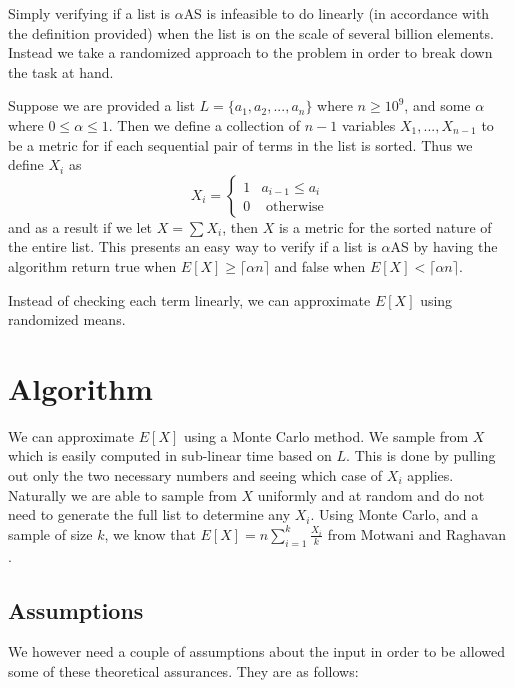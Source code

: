 \documentclass[11pt]{article}
\begin{document}
Simply verifying if a list is $\alpha$AS is infeasible to do linearly (in accordance with the definition provided) when the list is on the scale of several billion elements. Instead we take a randomized approach to the problem in order to break down the task at hand. 

Suppose we are provided a list $L = \{a_1, a_2, ..., a_n\}$ where $n \geq 10^9$, and some $\alpha$ where $0 \leq \alpha \leq 1$. Then we define a collection of $n-1$ variables $X_1, ..., X_{n-1}$ to be a metric for if each sequential pair of terms in the list is sorted. Thus we define $X_i$ as
$$X_i = 
\begin{cases}
	1 & a_{i-1} \leq a_i \\
	0 & \text{ otherwise}
\end{cases}$$
and as a result if we let $X = \sum X_i$, then $X$ is a metric for the sorted nature of the entire list. This presents an easy way to verify if a list is $\alpha$AS by having the algorithm return true when $E[X] \geq \lceil \alpha n \rceil$ and false when $E[X] < \lceil \alpha n \rceil$.

Instead of checking each term linearly, we can approximate $E[X]$ using randomized means. 

\section{Algorithm}

We can approximate $E[X]$ using a Monte Carlo method. We sample from $X$ which is easily computed in sub-linear time based on $L$. This is done by pulling out only the two necessary numbers and seeing which case of $X_i$ applies. Naturally we are able to sample from $X$ uniformly and at random and do not need to generate the full list to determine any $X_i$. Using Monte Carlo, and a sample of size $k$, we know that $E[X] = n \sum\limits^k_{i=1} \frac{X_i}{k}$ from Motwani and Raghavan \cite{textbook}. 

\subsection{Assumptions}

We however need a couple of assumptions about the input in order to be allowed some of these theoretical assurances. They are as follows:
\end{document}
